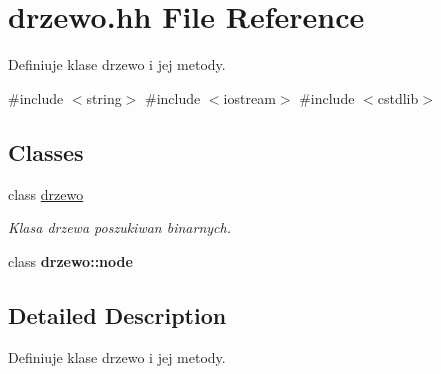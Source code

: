 \hypertarget{drzewo_8hh}{\section{drzewo.\-hh \-File \-Reference}
\label{drzewo_8hh}
}


\-Definiuje klase drzewo i jej metody.  


{\ttfamily \#include $<$string$>$}\*
{\ttfamily \#include $<$iostream$>$}\*
{\ttfamily \#include $<$cstdlib$>$}\*
\subsection*{\-Classes}
\begin{DoxyCompactItemize}
\item 
class \hyperlink{classdrzewo}{drzewo}
\begin{DoxyCompactList}\small\item\em \-Klasa drzewa poszukiwan binarnych. \end{DoxyCompactList}\item 
class {\bfseries drzewo\-::node}
\end{DoxyCompactItemize}


\subsection{\-Detailed \-Description}
\-Definiuje klase drzewo i jej metody. 